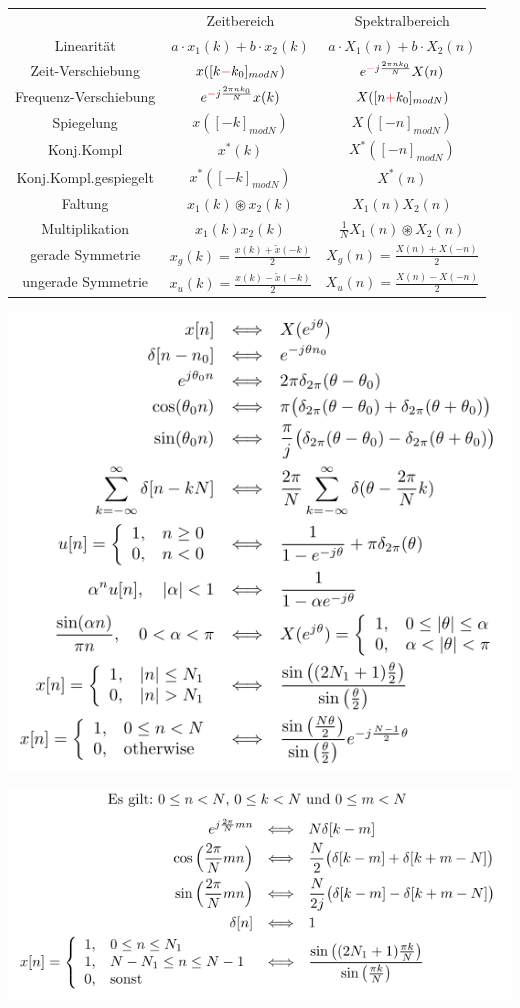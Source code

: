 \documentclass[10pt,a4paper]{article}
\begin{document}
\begin{center}
\begin{tabular}{ | c | c | c | }
\cline{1-3}
        & Zeitbereich & Spektralbereich \\
\cline{1-3}
        Linearität & $a\cdot x_1(k)+ b\cdot x_2(k)$ & $a\cdot X_1(n) +b\cdot X_2(n)$ \\
\cline{1-3}
        Zeit-Verschiebung & $x([k\textcolor{red}{-}k_0]_{modN})$ & $e^{\textcolor{red}{-}j\frac{2\pi nk_0}{N}} X(n)$\\
\cline{1-3}
        Frequenz-Verschiebung & $e^{\textcolor{red}{-}j\frac{2\pi nk_0}{N}} x(k)$ & $X([n\textcolor{red}{+}k_0]_{modN})$ \\  
\cline{1-3}
        Spiegelung & $x([-k]_{modN})$ & $X([-n]_{modN})$ \\  
\cline{1-3}
        Konj.Kompl & $x^*(k)$& $X^*([-n]_{modN})$\\ 
\cline{1-3}
        Konj.Kompl.gespiegelt & $x^*([-k]_{modN})$& $X^*(n)$\\ 
\cline{1-3}
        Faltung & $x_1(k) \circledast x_2(k)$ & $X_1(n)X_2(n)$ \\  
\cline{1-3}
        Multiplikation & $x_1(k)x_2(k)$ & $\frac{1}{N} X_1(n) \circledast X_2(n)$ \\
\cline{1-3}
        gerade Symmetrie & $x_g(k)=\frac{x(k)+\tilde{x}(-k)}{2}$ & $X_g(n)=\frac{X(n)+X(-n)}{2}$ \\
\cline{1-3}
        ungerade Symmetrie & $x_u(k)=\frac{x(k)-\tilde{x}(-k)}{2}$ & $X_u(n)=\frac{X(n)-X(-n)}{2}$ \\
\cline{1-3}
\end{tabular}
\end{center}
\normalsize
  \begin{center}
      \includegraphics[width=.35\textwidth]{./img/dtft.png}
  \end{center}
  \begin{center}
      \includegraphics[width=.35\textwidth]{./img/dft.png}
  \end{center}
\end{document}
